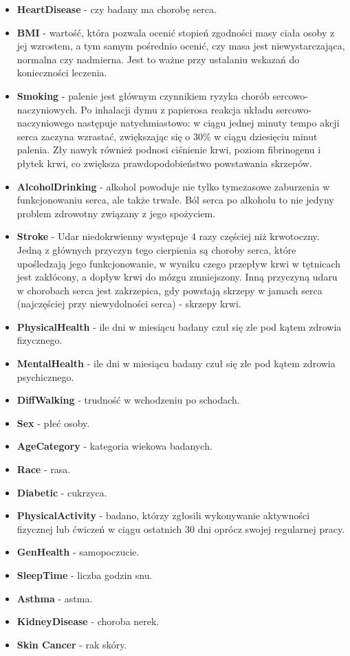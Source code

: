 \documentclass[
]{article}
\begin{document}
\begin{itemize}
\item
  \textbf{HeartDisease} - czy badany ma chorobę serca.
\item
  \textbf{BMI} - wartość, która pozwala ocenić stopień zgodności masy
  ciała osoby z jej wzrostem, a tym samym pośrednio ocenić, czy masa
  jest niewystarczająca, normalna czy nadmierna. Jest to ważne przy
  ustalaniu wskazań do konieczności leczenia.
\item
  \textbf{Smoking} - palenie jest głównym czynnikiem ryzyka chorób
  sercowo-naczyniowych. Po inhalacji dymu z papierosa reakcja układu
  sercowo-naczyniowego następuje natychmiastowo: w ciągu jednej minuty
  tempo akcji serca zaczyna wzrastać, zwiększając się o 30\% w ciągu
  dziesięciu minut palenia. Zły nawyk również podnosi ciśnienie krwi,
  poziom fibrinogenu i płytek krwi, co zwiększa prawdopodobieństwo
  powstawania skrzepów.
\item
  \textbf{AlcoholDrinking} - alkohol powoduje nie tylko tymczasowe
  zaburzenia w funkcjonowaniu serca, ale także trwałe. Ból serca po
  alkoholu to nie jedyny problem zdrowotny związany z jego spożyciem.
\item
  \textbf{Stroke} - Udar niedokrwienny występuje 4 razy częściej niż
  krwotoczny. Jedną z głównych przyczyn tego cierpienia są choroby
  serca, które upośledzają jego funkcjonowanie, w wyniku czego przepływ
  krwi w tętnicach jest zakłócony, a dopływ krwi do mózgu zmniejszony.
  Inną przyczyną udaru w chorobach serca jest zakrzepica, gdy powstają
  skrzepy w jamach serca (najczęściej przy niewydolności serca) -
  skrzepy krwi.
\item
  \textbf{PhysicalHealth} - ile dni w miesiącu badany czuł się zle pod
  kątem zdrowia fizycznego.
\item
  \textbf{MentalHealth} - ile dni w miesiącu badany czuł się zle pod
  kątem zdrowia psychicznego.
\item
  \textbf{DiffWalking} - trudność w wchodzeniu po schodach.
\item
  \textbf{Sex} - płeć osoby.
\item
  \textbf{AgeCategory} - kategoria wiekowa badanych.
\item
  \textbf{Race} - rasa.
\item
  \textbf{Diabetic} - cukrzyca.
\item
  \textbf{PhysicalActivity} - badano, którzy zgłosili wykonywanie
  aktywności fizycznej lub ćwiczeń w ciągu ostatnich 30 dni oprócz
  swojej regularnej pracy.
\item
  \textbf{GenHealth} - samopoczucie.
\item
  \textbf{SleepTime} - liczba godzin snu.
\item
  \textbf{Asthma} - astma.
\item
  \textbf{KidneyDisease} - choroba nerek.
\item
  \textbf{Skin Cancer} - rak skóry.
\end{itemize}
\end{document}
